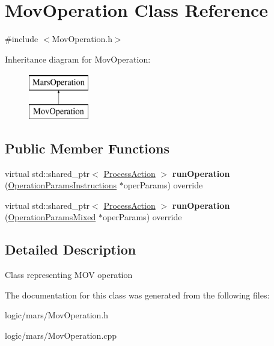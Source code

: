 \hypertarget{classMovOperation}{}\section{Mov\+Operation Class Reference}
\label{classMovOperation}


{\ttfamily \#include $<$Mov\+Operation.\+h$>$}

Inheritance diagram for Mov\+Operation\+:\begin{figure}[H]
\begin{center}
\leavevmode
\includegraphics[height=2.000000cm]{classMovOperation}
\end{center}
\end{figure}
\subsection*{Public Member Functions}
\begin{DoxyCompactItemize}
\item 
\mbox{\label{classMovOperation_a0d212f53fcc541ee5f934e19cca0ba46}} 
virtual std\+::shared\+\_\+ptr$<$ \hyperlink{classProcessAction}{Process\+Action} $>$ {\bfseries run\+Operation} (\hyperlink{classOperationParamsInstructions}{Operation\+Params\+Instructions} $\ast$oper\+Params) override
\item 
\mbox{\label{classMovOperation_adb37649782b83a02cd24f54445297cba}} 
virtual std\+::shared\+\_\+ptr$<$ \hyperlink{classProcessAction}{Process\+Action} $>$ {\bfseries run\+Operation} (\hyperlink{classOperationParamsMixed}{Operation\+Params\+Mixed} $\ast$oper\+Params) override
\end{DoxyCompactItemize}


\subsection{Detailed Description}
Class representing M\+OV operation 

The documentation for this class was generated from the following files\+:\begin{DoxyCompactItemize}
\item 
logic/mars/Mov\+Operation.\+h\item 
logic/mars/Mov\+Operation.\+cpp\end{DoxyCompactItemize}
